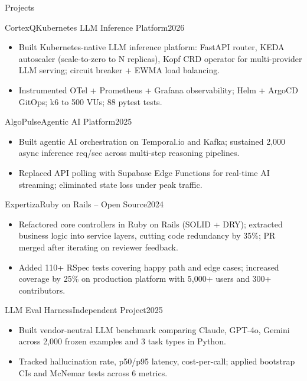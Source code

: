 \documentclass[]{mcdowellcv}
\begin{document}
\begin{cvsection}{Projects}
  \begin{cvsubsection}{CortexQ}{Kubernetes LLM Inference Platform}{2026}
    \begin{itemize}
      \item Built Kubernetes-native LLM inference platform: FastAPI router, KEDA autoscaler (scale-to-zero to N replicas), Kopf CRD operator for multi-provider LLM serving; circuit breaker + EWMA load balancing.
      \item Instrumented OTel + Prometheus + Grafana observability; Helm + ArgoCD GitOps; k6 to 500 VUs; 88 pytest tests.
    \end{itemize}
    \vspace{-1.5pt}
  \end{cvsubsection}

  \begin{cvsubsection}{AlgoPulse}{Agentic AI Platform}{2025}
    \begin{itemize}
      \item Built agentic AI orchestration on Temporal.io and Kafka; sustained 2,000 async inference req/sec across multi-step reasoning pipelines.
      \item Replaced API polling with Supabase Edge Functions for real-time AI streaming; eliminated state loss under peak traffic.
    \end{itemize}
    \vspace{-1.5pt}
  \end{cvsubsection}

  \begin{cvsubsection}{Expertiza}{Ruby on Rails -- Open Source}{2024}
    \begin{itemize}
      \item Refactored core controllers in Ruby on Rails (SOLID + DRY); extracted business logic into service layers, cutting code redundancy by 35\%; PR merged after iterating on reviewer feedback.
      \item Added 110+ RSpec tests covering happy path and edge cases; increased coverage by 25\% on production platform with 5,000+ users and 300+ contributors.
    \end{itemize}
    \vspace{-1.5pt}
  \end{cvsubsection}

  \begin{cvsubsection}{LLM Eval Harness}{Independent Project}{2025}
    \begin{itemize}
      \item Built vendor-neutral LLM benchmark comparing Claude, GPT-4o, Gemini across 2,000 frozen examples and 3 task types in Python.
      \item Tracked hallucination rate, p50/p95 latency, cost-per-call; applied bootstrap CIs and McNemar tests across 6 metrics.
    \end{itemize}
  \end{cvsubsection}
\end{cvsection}
\end{document}
